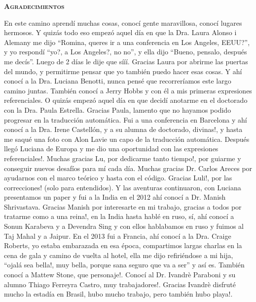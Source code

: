 \thispagestyle{empty}


\begin{center}

{ \vspace*{1cm} }
\huge{\textbf{\textsc{\textmd{Agradecimientos}}}}\\[1cm]

\end{center}

\normalsize{

En este camino aprend\'i muchas cosas, conoc\'i gente maravillosa, conoc\'i lugares hermosos. Y quiz\'as todo eso empez\'o aquel d\'ia en que la Dra. Laura Alonso i Alemany me dijo ``Romina, queres ir a una conferencia en Los Angeles, EEUU?'', y yo respond\'i ``yo?, a Los Angeles?, no no'', y ella dijo ``Bueno, pensalo, despu\'es me dec\'is''. Luego de 2 d\'ias le dije que s\'i\'i\'i. Gracias Laura por abrirme las puertas del mundo, y permitirme pensar que yo tambi\'en puedo hacer esas cosas. Y ah\'i conoc\'i a la Dra. Luciana Benotti, nunca pens\'e que recorrer\'iamos este largo camino juntas. Tambi\'en conoc\'i a Jerry Hobbs y con \'el a mis primeras expresiones referenciales. O quiz\'as empez\'o aquel d\'ia en que decid\'i anotarme en el doctorado con la Dra. Paula Estrella. Gracias Paula, lamento que no hayamos podido progresar en la traducci\'on autom\'atica. Fui a una conferencia en Barcelona y ah\'i conoc\'i a la Dra. Irene Castell\'on, y a su alumna de doctorado, divinas!, y hasta me saqu\'e una foto con Alon Lavie un capo de la traducci\'on autom\'atica. Despu\'es lleg\'o Luciana de Europa y me dio una oportunidad con las expresiones referenciales!. Muchas gracias Lu, por dedicarme tanto tiempo!, por guiarme y conseguir nuevos desaf\'ios para m\'i cada d\'ia. Muchas gracias Dr. Carlos Areces por ayudarnos con el marco te\'orico y hasta con el c\'odigo. Gracias Luli!, por las correcciones! (solo para entendidos). Y las aventuras continuaron, con Luciana presentamos un paper y fui a la India en el 2012 ah\'i conoc\'i a Dr. Manish Shrivastava. Gracias Manish por interesarte en mi trabajo, gracias a todos por tratarme como a una reina!, en la India hasta habl\'e en ruso, s\'i, ah\'i conoc\'i a Sonun Karabeva y a Devendra Sing y con ellos hablabamos en ruso y fuimos al Taj Mahal y a Jaipur. En el 2013 fui a Francia, ah\'i conoc\'i a la Dra. Craige Roberts, yo estaba embarazada en esa \'epoca, compartimos largas charlas en la cena de gala y camino de vuelta al hotel, ella me dijo refiri\'endose a mi hija, ``ojal\'a sea bella!, muy bella, porque sana seguro que va a ser'' y as\'i es. Tambi\'en conoc\'i a Mattew Stone, que personaje!. Conoc\'i al Dr. Ivandr\`e Paraboni y su alumno Thiago Ferreyra Castro, muy trabajadores!. Gracias Ivandr\`e disfrut\'e mucho la estad\'ia en Brasil, hubo mucho trabajo, pero tambi\'en hubo playa!.

}
